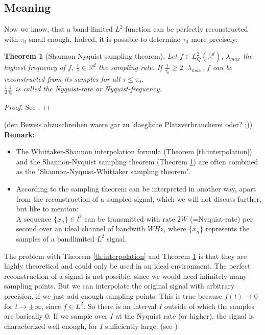 \documentclass[a4paper, 11pt]{scrreprt}
\newtheorem{theorem}[defi]{Theorem}
\newcommand{\RR}{\mathbb{R}}
\begin{document}
\subsection{Meaning}

Now we know, that a band-limited \(L^2\) function can be perfectly reconstructed with \(\tau_0\) small enough. Indeed, it is possible to determine \(\tau_0\) more precisely:
\begin{theorem}[Shannon-Nyquist sampling theorem]
\label{th:sampling}
Let \(f\in L^2_Q(\RR^d)\), \(\lambda_{max}\) the highest frequency of \(f\), \(\frac{1}{\tau}\in \RR^d\) the sampling rate. If \(\frac{1}{\tau_0} \geq 2\cdot \lambda_{max}\), \(f\) can be reconstructed from its samples for all \(\tau \leq \tau_0\).\\
\(\frac 1 2 \frac{1}{\tau_0}\) is called the Nyquist-rate or Nyquist-frequency.
\end{theorem} 
\begin{proof}
See \cite{shannon01}.
\end{proof}
(den Beweis abzuschreiben waere gar zu klaegliche Platzverbraucherei oder? ;))\\
\textbf{Remark:}
\begin{itemize}
\item The Whittaker-Shannon interpolation formula (Theorem  \ref{th:interpolation}) and the Shannon-Nyquist sampling theorem (Theorem \ref{th:sampling}) are often combined as the "Shannon-Nyquist-Whittaker sampling theorem".
\item According to \cite{landau04} the sampling theorem can be interpreted in another way,  apart from the reconstruction of a sampled signal, which we will not discuss further, but like to mention: \\
A sequence \(\{x_n\}\in l^2\) can be transmitted with rate \(2W\) (=Nyquist-rate) per second over an ideal channel of bandwith \(W Hz\), where \(\{x_n\}\) represents the samples of a bandlimited \(L^2\) signal.

\end{itemize}
The problem with Theorem  \ref{th:interpolation} and Theorem \ref{th:sampling} is that they are highly theoretical and could only be used in an ideal environment. The perfect reconstruction of a signal is not possible, since we would need infinitely many sampling points. But we can interpolate the original signal with arbitrary precision, if we just add enough sampling points. This is true because \(f(t)\to 0\) for \(t\to\pm\infty\), since \(f\in L^2\). So there is an interval \(I\) outside of which the samples are basically 0. If we sample over \(I\) at the Nyquist rate (or higher), the signal is characterized well enough, for \(I\) sufficiently large. (see \cite{marks02})\\
\end{document}
